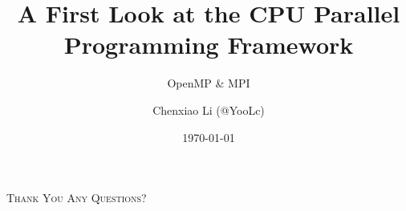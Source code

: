 \documentclass{zjusct-beamer/zjusct}
\title{A First Look at the CPU Parallel Programming Framework}
\subtitle{OpenMP \& MPI}
\author[YooLc]{Chenxiao Li (@YooLc)}
\date{\today}
\institute[ZJUSCT]{Zhejiang University Supercomputing Team}
\begin{document}
\setmonofont{DejaVu Sans Mono}

\maketitle

\cutoc












\begin{frame}[standout]
    \Huge\textsc{Thank You}
    \vfill
    \LARGE\textsc{Any Questions?}
\end{frame}
\end{document}
